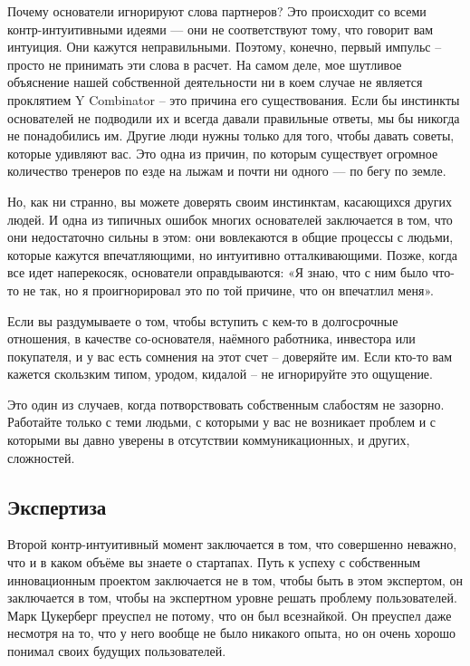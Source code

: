 \documentclass[ebook,12pt,oneside,openany]{memoir}
\begin{document}
Почему основатели игнорируют слова партнеров? Это происходит со всеми
контр-интуитивными идеями — они не соответствуют тому, что говорит вам
интуиция. Они кажутся неправильными. Поэтому, конечно, первый импульс
– просто не принимать эти слова в расчет. На самом деле, мое шутливое
объяснение нашей собственной деятельности ни в коем случае не является
проклятием Y Combinator – это причина его существования. Если бы
инстинкты основателей не подводили их и всегда давали правильные
ответы, мы бы никогда не понадобились им. Другие люди нужны только для
того, чтобы давать советы, которые удивляют вас. Это одна из причин,
по которым существует огромное количество тренеров по езде на лыжам и
почти ни одного — по бегу по земле. \newline

Но, как ни странно, вы можете доверять своим инстинктам, касающихся
других людей. И одна из типичных ошибок многих основателей заключается
в том, что они недостаточно сильны в этом: они вовлекаются в общие
процессы с людьми, которые кажутся впечатляющими, но интуитивно
отталкивающими. Позже, когда все идет наперекосяк, основатели
оправдываются: «Я знаю, что с ним было что-то не так, но я
проигнорировал это по той причине, что он впечатлил меня». \newline

Если вы раздумываете о том, чтобы вступить с кем-то в долгосрочные
отношения, в качестве со-основателя, наёмного работника, инвестора или
покупателя, и у вас есть сомнения на этот счет – доверяйте им. Если
кто-то вам кажется скользким типом, уродом, кидалой – не игнорируйте
это ощущение. \newline

Это один из случаев, когда потворствовать собственным слабостям не
зазорно. Работайте только с теми людьми, с которыми у вас не возникает
проблем и с которыми вы давно уверены в отсутствии коммуникационных, и
других, сложностей. \newline

\subsection{Экспертиза}

Второй контр-интуитивный момент заключается в том, что совершенно
неважно, что и в каком объёме вы знаете о стартапах. Путь к успеху с
собственным инновационным проектом заключается не в том, чтобы быть в
этом экспертом, он заключается в том, чтобы на экспертном уровне
решать проблему пользователей. Марк Цукерберг преуспел не потому, что
он был всезнайкой. Он преуспел даже несмотря на то, что у него вообще
не было никакого опыта, но он очень хорошо понимал своих будущих
пользователей. \newline
\end{document}
